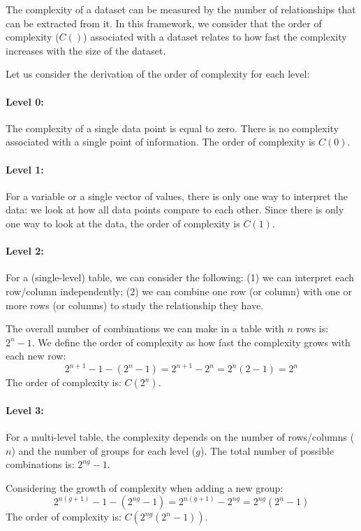 \documentclass[Afour,times,sageh]{sagej}
\begin{document}
The complexity of a dataset can be measured by the number of relationships that can be extracted from it. In this framework, we consider that the order of complexity ($C()$) associated with a dataset relates to how fast the complexity increases with the size of the dataset.

Let us consider the derivation of the order of complexity for each level:

\paragraph{Level 0:}
The complexity of a single data point is equal to zero. There is no complexity associated with a single point of information. The order of complexity is $C(0)$.

\paragraph{Level 1:}
For a variable or a single vector of values, there is only one way to interpret the data: we look at how all data points compare to each other. Since there is only one way to look at the data, the order of complexity is $C(1)$.

\paragraph{Level 2:}
For a (single-level) table, we can consider the following: (1) we can interpret each row/column independently; (2) we can combine one row (or column) with one or more rows (or columns) to study the relationship they have.

The overall number of combinations we can make in a table with $n$ rows is: $2^n - 1$. We define the order of complexity as how fast the complexity grows with each new row:
\begin{equation}
2^{n+1} - 1 - (2^n - 1) = 2^{n+1} - 2^n = 2^n (2 - 1) = 2^n
\end{equation}
The order of complexity is: $C(2^n)$.

\paragraph{Level 3:}
For a multi-level table, the complexity depends on the number of rows/columns ($n$) and the number of groups for each level ($g$). The total number of possible combinations is: $2^{ng} - 1$.

Considering the growth of complexity when adding a new group:
\begin{equation}
2^{n(g+1)} - 1 - (2^{ng} - 1) = 2^{n(g+1)} - 2^{ng} = 2^{ng} (2^n - 1)
\end{equation}
The order of complexity is: $C(2^{ng}(2^n - 1))$.
\end{document}
